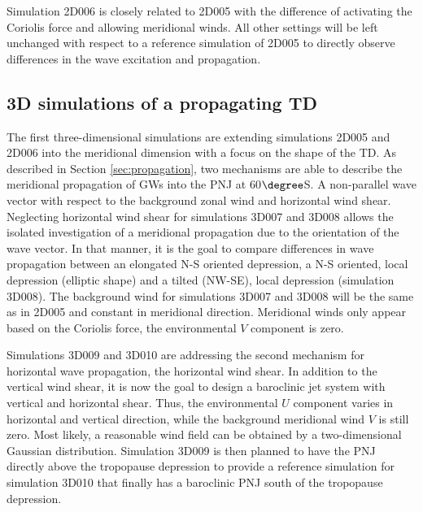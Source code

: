 Simulation 2D006 is closely related to 2D005 with the difference of activating the Coriolis force and allowing meridional winds. All other settings will be left unchanged with respect to a reference simulation of 2D005 to directly observe differences in the wave excitation and propagation.  






\subsection{3D simulations of a propagating TD}
\label{sec:3D}

The first three-dimensional simulations are extending simulations 2D005 and 2D006 into the meridional dimension with a focus on the shape of the TD. As described in Section \ref{sec:propagation}, two mechanisms are able to describe the meridional propagation of GWs into the PNJ at 60$\degree$S. A non-parallel wave vector with respect to the background zonal wind and horizontal wind shear. Neglecting horizontal wind shear for simulations 3D007 and 3D008 allows the isolated investigation of a meridional propagation due to the orientation of the wave vector. In that manner, it is the goal to compare differences in wave propagation between an elongated N-S oriented depression, a N-S oriented, local depression (elliptic shape) and a tilted (NW-SE), local depression (simulation 3D008). The background wind for simulations 3D007 and 3D008 will be the same as in 2D005 and constant in meridional direction. Meridional winds only appear based on the Coriolis force, the environmental $V$ component is zero. 

Simulations 3D009 and 3D010 are addressing the second mechanism for horizontal wave propagation, the horizontal wind shear. In addition to the vertical wind shear, it is now the goal to design a baroclinic jet system with vertical and horizontal shear. Thus, the environmental $U$ component varies in horizontal and vertical direction, while the background meridional wind $V$ is still zero. Most likely, a reasonable wind field can be obtained by a two-dimensional Gaussian distribution. Simulation 3D009 is then planned to have the PNJ directly above the tropopause depression to provide a reference simulation for simulation 3D010 that finally has a baroclinic PNJ south of the tropopause depression. 

